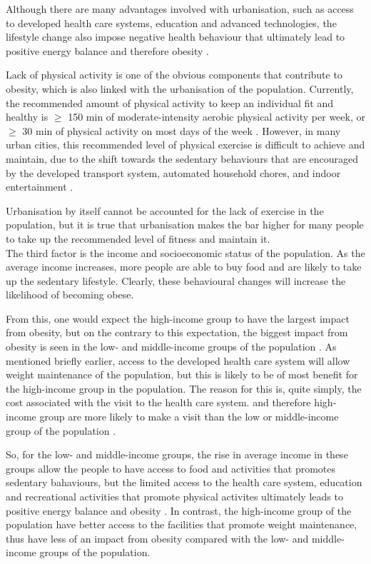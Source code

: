 Although there are many advantages involved with urbanisation, such as access to developed health care systems, education and advanced technologies, the lifestyle change also impose negative health behaviour that ultimately lead to positive energy balance and therefore obesity \citep{Malik2013}.

Lack of physical activity is one of the obvious components that contribute to obesity, which is also linked with the urbanisation of the population.
Currently, the recommended amount of physical activity to keep an individual fit and healthy is $\geq$ 150 min of moderate-intensity aerobic physical activity per week, or $\geq$ 30 min of physical activity on most days of the week \citep{Pate1995, WHO2010}.
However, in many urban cities, this recommended level of physical exercise is difficult to achieve and maintain, due to the shift towards the sedentary behaviours that are encouraged by the developed transport system, automated household chores, and indoor entertainment \citep{Malik2013}.

Urbanisation by itself cannot be accounted for the lack of exercise in the population, but it is true that urbanisation makes the bar higher for many people to take up the recommended level of fitness and maintain it. \\

\noindent
The third factor is the income and socioeconomic status of the population.
As the average income increases, more people are able to buy food and are likely to take up the sedentary lifestyle.
Clearly, these behavioural changes will increase the likelihood of becoming obese.

From this, one would expect the high-income group to have the largest impact from obesity, but on the contrary to this expectation, the biggest impact from obesity is seen in the low- and middle-income groups of the population \citep{Malik2013}.
As mentioned briefly earlier, access to the developed health care system will allow weight maintenance of the population, but this is likely to be of most benefit for the high-income group in the population.
The reason for this is, quite simply, the cost associated with the visit to the health care system.
and therefore high-income group are more likely to make a visit than the low or middle-income group of the population \citep{Malik2013}.

So, for the low- and middle-income groups, the rise in average income in these groups allow the people to have access to food and activities that promotes sedentary bahaviours, but the limited access to the health care system, education and recreational activities that promote physical activites ultimately leads to positive energy balance and obesity \citep{Malik2013}.
In contrast, the high-income group of the population have better access to the facilities that promote weight maintenance, thus have less of an impact from obesity compared with the low- and middle-income groups of the population.\\

